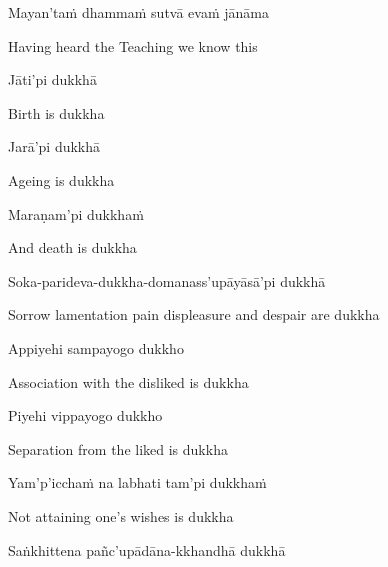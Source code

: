 \ifafive\clearpage\fi
\ifbfive\clearpage\fi

Mayan'taṁ dhammaṁ sutvā evaṁ jānāma

\begin{english}
  Having heard the Teaching we know this
\end{english}

\suttaRef{[Thai]}

Jāti'pi dukkhā

\begin{english}
  Birth is dukkha
\end{english}

Jarā'pi dukkhā

\begin{english}
  Ageing is dukkha
\end{english}

Maraṇam'pi dukkhaṁ

\begin{english}
  And death is dukkha
\end{english}

\ifninebythirteen\clearpage\fi

Soka-parideva-dukkha-domanass'upāyāsā'pi dukkhā

\begin{english-hang}
  Sorrow lamentation pain displeasure\ifdigital\makeatletter\hyperlink{endnote14-appendix}\makeatother\fi
  and despair are dukkha
\end{english-hang}

Appiyehi sampayogo dukkho

\begin{english}
  Association with the disliked is dukkha
\end{english}

Piyehi vippayogo dukkho

\begin{english}
  Separation from the liked is dukkha
\end{english}

Yam'p'icchaṁ na labhati tam'pi dukkhaṁ

\begin{english}
  Not attaining one's wishes is dukkha
\end{english}

\suttaRef{[MN 10]}

Saṅkhittena pañc'upādāna-kkhandhā dukkhā

